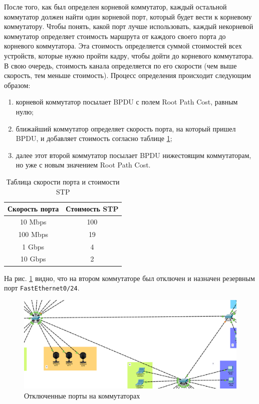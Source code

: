 \documentclass[a4paper, 14pt]{extarticle}
\begin{document}
После того, как был определен корневой коммутатор, каждый остальной коммутатор
должен найти один корневой порт, который будет вести к корневому коммутатору.
Чтобы понять, какой порт лучше использовать, каждый некорневой коммутатор
определяет стоимость маршрута от каждого своего порта до корневого коммутатора.
Эта стоимость определяется суммой стоимостей всех устройств, которые нужно
пройти кадру, чтобы дойти до корневого коммутатора. В свою очередь, стоимость
канала определяется по его скорости (чем выше скорость, тем меньше
стоимость). Процесс определения происходит следующим образом:

\begin{enumerate}
  \item корневой коммутатор посылает BPDU с полем Root Path Cost, равным нулю;
  \item ближайший коммутатор определяет скорость порта, на который пришел BPDU,
  и добавляет стоимость согласно таблице \ref{tab:stp-cost};
  \item далее этот второй коммутатор посылает BPDU нижестоящим коммутаторам, но
  уже с новым значением Root Path Cost.
\end{enumerate}

\begin{table}[H]
  \centering
  \renewcommand*{\arraystretch}{1.25}
  \setlength{\tabcolsep}{24pt}

  \caption{Таблица скорости порта и стоимости STP}
  \label{tab:stp-cost}
  \begin{tabular}{|c|c|}
    \hline
    \textbf{Скорость порта} & \textbf{Стоимость STP} \\
    \hline
    10 Mbps                 & 100                    \\
    \hline
    100 Mbps                & 19                     \\
    \hline
    1 Gbps                  & 4                      \\
    \hline
    10 Gbps                 & 2                      \\
    \hline
  \end{tabular}
\end{table}

На рис. \ref{fig:stp-disabled-ports} видно, что на втором коммутаторе был
отключен и назначен резервным порт \texttt{FastEthernet0/24}.

\begin{figure}[H]
  \centering
  \includegraphics[width=\textwidth]{images/stp/disabled-ports.png}
  \caption{Отключенные порты на коммутаторах}
  \label{fig:stp-disabled-ports}
\end{figure}
\end{document}
